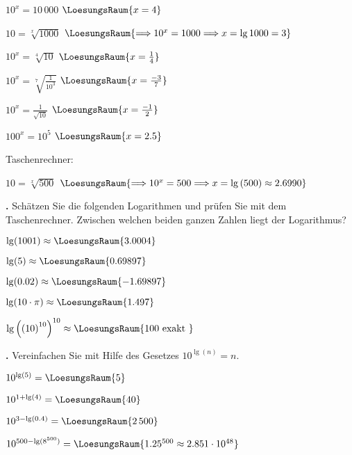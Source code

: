 \begin{bbwAufgabenBlock}
\item $10^x = 10\,000$ $\LoesungsRaum{x=4}$

\item $10 = \sqrt[x]{1000}$ $\LoesungsRaum{\Longrightarrow 10^x=1000 \Longrightarrow x=\lg{1000} = 3}$

\item $10^x = \sqrt[4]{10}$ $\LoesungsRaum{x=\frac14}$
\item $10^x = \sqrt[7]{\frac1{10^3}}$ $\LoesungsRaum{x=\frac{-3}{7}}$
\item $10^x = \frac{1}{\sqrt{10}}$ $\LoesungsRaum{x=\frac{-1}2}$
\item $100^x = 10^5$ $\LoesungsRaum{x=2.5}$

\vspace{2mm} Taschenrechner:
\item $10 = \sqrt[x]{500}$ $\LoesungsRaum{\Longrightarrow 10^x=500 \Longrightarrow x=\lg{}(500) \approx 2.6990}$


\end{bbwAufgabenBlock}

\newpage

\textbf{\bbwAufgabenNummer{}.}
Schätzen Sie die folgenden Logarithmen und prüfen Sie mit dem
Taschenrechner. Zwischen welchen beiden ganzen Zahlen liegt der Logarithmus?


\begin{bbwAufgabenBlock}
\item $\lg(1001) \approx  \LoesungsRaum{3.0004}$
\item $\lg(5) \approx  \LoesungsRaum{0.69897}$
\item $\lg(0.02) \approx  \LoesungsRaum{-1.69897}$
\item $\lg(10\cdot{}\pi) \approx  \LoesungsRaum{1.497}$
\item $\lg\left(\left(10\right)^{10}\right)^{10} \approx  \LoesungsRaum{100 \text{ exakt }}$

\end{bbwAufgabenBlock}
\newpage

\textbf{\bbwAufgabenNummer{}.}
Vereinfachen Sie mit Hilfe des Gesetzes $10^{\lg(n)} = n$.


\begin{bbwAufgabenBlock}
\item $10^{\lg(5)} =  \LoesungsRaum{5}$
\item $10^{1+\lg(4)} =  \LoesungsRaum{40}$
\item $10^{3-\lg(0.4)} =  \LoesungsRaum{2\,500}$
\item $10^{500-\lg(8^{500})} = \LoesungsRaum{1.25^{500} \approx 2.851\cdot{}10^{48}}$
\end{bbwAufgabenBlock}


